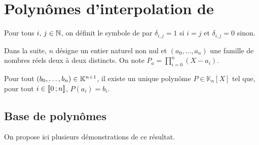 \section{Polynômes d'interpolation de }


Pour tous $i,\, j \in \mathbb{N}$, on définit le symbole de  par $\delta_{i,j} = 1$ si $i = j$ et $\delta_{i,j} = 0$ sinon.

Dans la suite, $n$ désigne un entier naturel non nul et $(a_0, \ldots, a_n)$ une famille de nombres réels deux à deux distincts. On note $P_a = \prod\limits_{i=0}^n (X - a_i)$.

\begin{defi}
Pour tout $(b_0,\ldots,b_n) \in \mathbb{K}^{n+1}$, il existe un unique polynôme $P \in \mathbb{K}_n[X]$ tel que, pour tout $i \in \llbracket 0\,; n \rrbracket$, $P(a_i) = b_i$.
\end{defi}




\subsection{Base de polynômes}

On propose ici plusieurs démonstrations de ce résultat.

